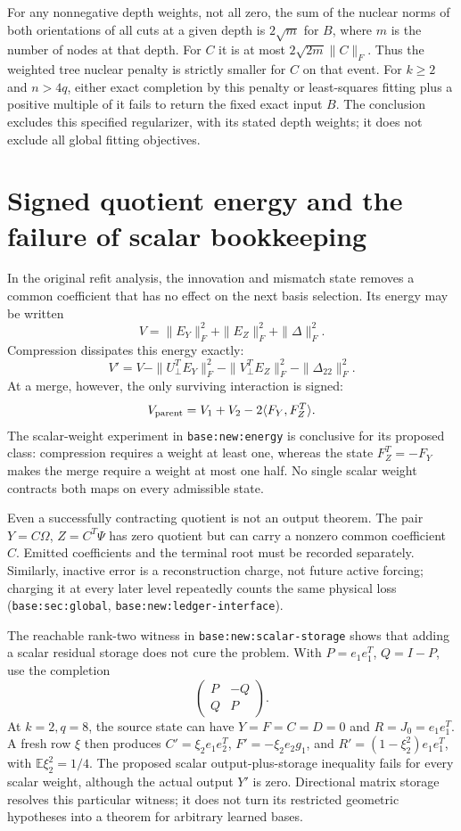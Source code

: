 \documentclass[11pt,oneside,openany,a4paper]{report}
\numberwithin{equation}{chapter}
\theoremstyle{definition}
\theoremstyle{remark}
\begin{document}
For any nonnegative depth weights, not all zero, the sum of the
nuclear norms of both orientations of all cuts at a given depth is
$2\sqrt m$ for $B$, where $m$ is the number of nodes at that depth.
For $C$ it is at most $2\sqrt{2m}\|C\|_F$.  Thus the weighted tree
nuclear penalty is strictly smaller for $C$ on that event.  For
$k\ge2$ and $n>4q$, either exact completion by this penalty or
least-squares fitting plus a positive multiple of it fails to return
the fixed exact input $B$.  The conclusion excludes this specified
regularizer, with its stated depth weights; it does not exclude all
global fitting objectives.

\section{Signed quotient energy and the failure of scalar bookkeeping}
\label{origobs:quotient}

In the original refit analysis, the innovation and mismatch state
removes a common coefficient that has no effect on the next basis
selection.  Its energy may be written
\[
 V=\|E_Y\|_F^2+\|E_Z\|_F^2+\|\Delta\|_F^2.
\]
Compression dissipates this energy exactly:
\[
 V'=V-\|U_\perp^TE_Y\|_F^2-\|V_\perp^TE_Z\|_F^2
        -\|\Delta_{22}\|_F^2.
\]
At a merge, however, the only surviving interaction is signed:
\[
 V_{\rm parent}=V_1+V_2-2\langle F_Y,F_Z^T\rangle.
\]
The scalar-weight experiment in \texttt{base:new:energy} is conclusive
for its proposed class: compression requires a weight at least one,
whereas the state $F_Z^T=-F_Y$ makes the merge require a weight at most
one half.  No single scalar weight contracts both maps on every
admissible state.

Even a successfully contracting quotient is not an output theorem.
The pair $Y=C\Omega$, $Z=C^T\Psi$ has zero quotient but can carry a
nonzero common coefficient $C$.  Emitted coefficients and the terminal
root must be recorded separately.  Similarly, inactive error is a
reconstruction charge, not future active forcing; charging it at every
later level repeatedly counts the same physical loss
(\texttt{base:sec:global}, \texttt{base:new:ledger-interface}).

The reachable rank-two witness in
\texttt{base:new:scalar-storage} shows that adding a scalar residual
storage does not cure the problem.  With $P=e_1e_1^T$,
$Q=I-P$, use the completion
\[
 \begin{pmatrix}P&-Q\\Q&P\end{pmatrix}.
\]
At $k=2,q=8$, the source state can have $Y=F=C=D=0$ and
$R=J_0=e_1e_1^T$.  A fresh row $\xi$ then produces
$C'=\xi_2e_1e_2^T$, $F'=-\xi_2e_2g_1$, and
$R'=(1-\xi_2^2)e_1e_1^T$, with
$\mathbb E\xi_2^2=1/4$.  The proposed scalar output-plus-storage
inequality fails for every scalar weight, although the actual output
$Y'$ is zero.  Directional matrix storage resolves this particular
witness; it does not turn its restricted geometric hypotheses into a
theorem for arbitrary learned bases.
\end{document}
